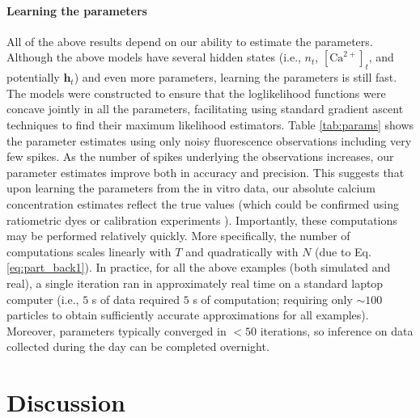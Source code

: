 \documentclass[10pt]{article}
\providecommand{\ve}[1]{\boldsymbol{#1}}
\providecommand{\ve}[1]{\boldsymbol{#1}}
\newcommand{\Ca}{[\text{Ca}^{2+}]}
\begin{document}
\paragraph{Learning the parameters}

All of the above results depend on our ability to estimate the parameters. Although the above models have several hidden states (i.e., $n_t$, $\Ca_t$, and potentially $\ve{h}_t$) and even more parameters, learning the parameters is still fast. The models were constructed to ensure that the loglikelihood functions were concave jointly in all the parameters, facilitating using standard gradient ascent techniques to find their maximum likelihood estimators. Table \ref{tab:params} shows the parameter estimates using only noisy fluorescence observations including very few spikes. As the number of spikes underlying the observations increases, our parameter estimates improve both in accuracy and precision.  This suggests that upon learning the parameters from the in vitro data, our absolute calcium concentration estimates reflect the true values (which could be confirmed using ratiometric dyes or calibration experiments \cite{YasudaSvoboda04}). Importantly, these computations may be performed relatively quickly. More specifically, the number of computations scales linearly with $T$ and quadratically with $N$ (due to Eq. \ref{eq:part_back1}).  In practice, for all the above examples (both simulated and real), a single iteration ran in approximately real time on a standard laptop computer (i.e., $5$ s of data required $5$ s of computation; requiring only $\sim 100$ particles to obtain sufficiently accurate approximations for all examples). Moreover, parameters typically converged in $<50$ iterations, so inference on data collected during the day can be completed overnight.  %

\section*{Discussion}
\end{document}
